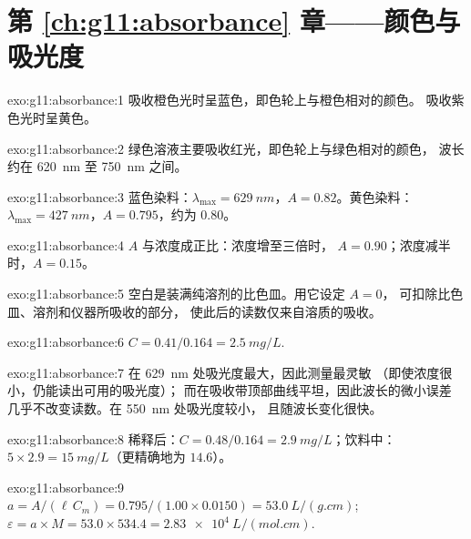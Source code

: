 \section*{第 \ref{ch:g11:absorbance} 章——颜色与吸光度}

\begin{solution}{exo:g11:absorbance:1}
吸收橙色光时呈蓝色，即色轮上与橙色相对的颜色。
吸收紫色光时呈黄色。
\end{solution}

\begin{solution}{exo:g11:absorbance:2}
绿色溶液主要吸收红光，即色轮上与绿色相对的颜色，
波长约在 \qty{620}{nm} 至 \qty{750}{nm} 之间。
\end{solution}

\begin{solution}{exo:g11:absorbance:3}
蓝色染料：$\lambda_{\max} = \qty{629}{nm}$，$A = 0.82$。黄色染料：
$\lambda_{\max} = \qty{427}{nm}$，$A = 0.795$，约为 0.80。
\end{solution}

\begin{solution}{exo:g11:absorbance:4}
$A$ 与浓度成正比：浓度增至三倍时，
$A = 0.90$；浓度减半时，$A = 0.15$。
\end{solution}

\begin{solution}{exo:g11:absorbance:5}
空白是装满纯溶剂的比色皿。用它设定 $A = 0$，
可扣除比色皿、溶剂和仪器所吸收的部分，
使此后的读数仅来自溶质的吸收。
\end{solution}

\begin{solution}{exo:g11:absorbance:6}
$C = 0.41 / 0.164 = \qty{2.5}{mg/L}$.
\end{solution}

\begin{solution}{exo:g11:absorbance:7}
在 \qty{629}{nm} 处吸光度最大，因此测量最灵敏
（即使浓度很小，仍能读出可用的吸光度）；
而在吸收带顶部曲线平坦，因此波长的微小误差
几乎不改变读数。在 \qty{550}{nm} 处吸光度较小，
且随波长变化很快。
\end{solution}

\begin{solution}{exo:g11:absorbance:8}
稀释后：$C = 0.48 / 0.164 = \qty{2.9}{mg/L}$；饮料中：
$5 \times 2.9 = \qty{15}{mg/L}$（更精确地为 $14.6$）。
\end{solution}

\begin{solution}{exo:g11:absorbance:9}
$a = A / (\ell\, C_m) = 0.795 / (1.00 \times 0.0150) = \qty{53.0}{L/(g.cm)}$;
$\varepsilon = a \times M = 53.0 \times 534.4 = \qty{2.83e4}{L/(mol.cm)}$.
\end{solution}

